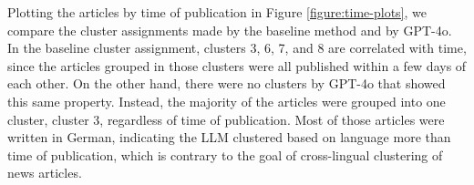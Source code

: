 



Plotting the articles by time of publication in Figure \ref{figure:time-plots}, we compare the cluster assignments made by the baseline method and by GPT-4o.
In the baseline cluster assignment, clusters 3, 6, 7, and 8 are correlated with time, since the articles grouped in those clusters were all published within a few days of each other.
On the other hand, there were no clusters by GPT-4o that showed this same property.
Instead, the majority of the articles were grouped into one cluster, cluster 3, regardless of time of publication.
Most of those articles were written in German, indicating the LLM clustered based on language more than time of publication, which is contrary to the goal of cross-lingual clustering of news articles.



